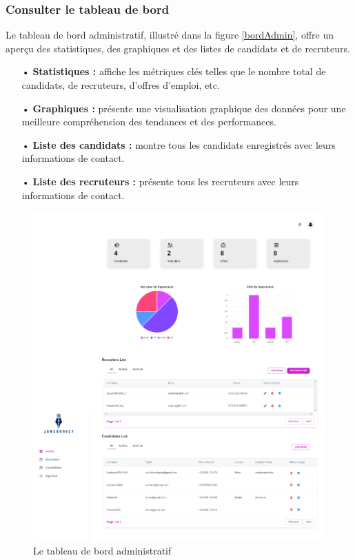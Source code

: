 \subsubsection{Consulter le tableau de bord}

Le tableau de bord administratif, illustré dans la figure \ref{bordAdmin}, offre un aperçu des statistiques, des graphiques et des listes de candidats et de recruteurs.

\begin{itemize}
    \item[•] \textbf{Statistiques :} affiche les métriques clés telles que le nombre total de candidats, de recruteurs, d'offres d'emploi, etc.
    \item[•] \textbf{Graphiques :} présente une visualisation graphique des données pour une meilleure compréhension des tendances et des performances.
    \item[•] \textbf{Liste des candidats :} montre tous les candidats enregistrés avec leurs informations de contact.
    \item[•] \textbf{Liste des recruteurs :} présente tous les recruteurs avec leurs informations de contact.
\end{itemize}

\begin{figure}[htbp]
   \centering
   \includegraphics[scale=0.2]{screens/dashAdmin.png} 
   \caption{Le tableau de bord administratif}
   \label{fig:bordAdmin}
\end{figure}

